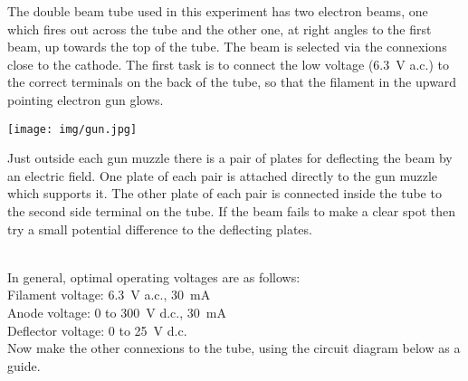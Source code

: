 The double beam tube used in this experiment has two electron beams, one which fires out across the tube and the other one, at right angles to the first beam, up towards the top of the tube.  The beam is selected via the connexions close to the cathode.  The first task is to connect the low voltage (\SI{6.3}{V} a.c.) to the correct terminals on the back of the tube, so that the filament in the upward pointing electron gun glows.\\

\begin{minipage}{0.3\textwidth}\texttt{[image: img/gun.jpg]}\end{minipage}
\begin{minipage}{0.6\textwidth}Just outside each gun muzzle there is a pair of plates for deflecting the beam by an electric field. One plate of each pair is attached directly to the gun muzzle which supports it. The other plate of each pair is connected inside the tube to the second side terminal on the tube. If the beam fails to make a clear spot then try a small potential difference to the deflecting plates.\end{minipage}\\

\newpage
In general, optimal operating voltages are as follows:\\
Filament voltage: \SI{6.3}{V} a.c., \SI{30}{mA}\\
Anode voltage: 0 to \SI{300}{V} d.c., \SI{30}{mA}\\
Deflector voltage: 0 to \SI{25}{V} d.c.\\

Now make the other connexions to the tube, using the circuit diagram below as a guide.

